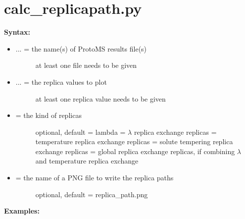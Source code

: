 \documentclass[letterpaper,10pt,english]{sphinxmanual}
\begin{document}
\section{calc\_replicapath.py}
\label{tools:calc-replicapath-py}
\textbf{Syntax:}

\begin{itemize}
\item {} \begin{description}
\item[{ ... = the name(s) of ProtoMS results file(s)}] \leavevmode
at least one file needs to be given

\end{description}

\item {} \begin{description}
\item[{ ... = the replica values to plot}] \leavevmode
at least one replica value needs to be given

\end{description}

\item {} \begin{description}
\item[{ = the kind of replicas}] \leavevmode
optional, default = lambda
 = \(\lambda\) replica exchange replicas
 = temperature replica exchange replicas
 = solute tempering replica exchange replicas
 = global replica exchange replicas, if combining \(\lambda\) and temperature replica exchange

\end{description}

\item {} \begin{description}
\item[{ = the name of a PNG file to write the replica paths}] \leavevmode
optional, default = replica\_path.png

\end{description}

\end{itemize}

\textbf{Examples:}
\end{document}
